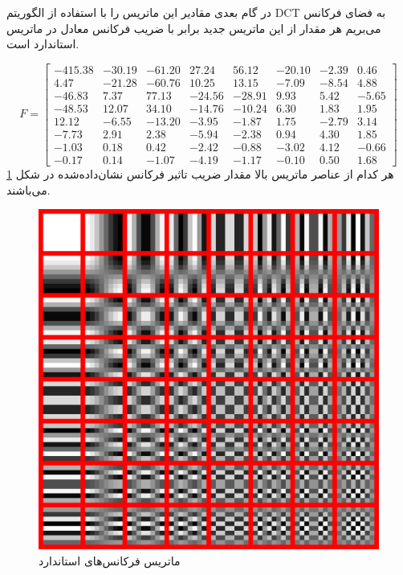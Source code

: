 در گام بعدی مقادیر این ماتریس را با استفاده از الگوریتم 
DCT به فضای فرکانس می‌بریم
هر مقدار از این ماتریس جدید برابر با ضریب فرکانس معادل در ماتریس 
استاندارد است. 

\[
        F = \begin{bmatrix}
                -415.38 & -30.19 & -61.20 & 27.24 & 56.12 & -20.10 & -2.39 & 0.46\\
                4.47 & -21.28 & -60.76 & 10.25 & 13.15 & -7.09 & -8.54 & 4.88 \\
                -46.83 & 7.37 & 77.13 & -24.56 & -28.91 & 9.93 & 5.42 & -5.65 \\
                -48.53 & 12.07 & 34.10 & -14.76 & -10.24 & 6.30 & 1.83 & 1.95 \\
                12.12 & -6.55 & -13.20 & -3.95 & -1.87 & 1.75 & -2.79 & 3.14 \\
                -7.73 & 2.91 & 2.38 & -5.94 & -2.38 & 0.94 & 4.30 & 1.85 \\
                -1.03 & 0.18 & 0.42 & -2.42 & -0.88 & -3.02 & 4.12 & -0.66 \\
                -0.17 & 0.14 & -1.07 & -4.19 & -1.17 & -0.10 & 0.50 & 1.68 

        \end{bmatrix}
\]
هر کدام از عناصر ماتریس بالا مقدار ضریب تاثیر فرکانس نشان‌داده‌شده در شکل 
\ref{freq_3} 
می‌باشند. 

\begin{figure}[]
        \centering
        \includegraphics[]{figs/freq_3.png}
        \caption{ماتریس فرکانس‌های استاندارد}
        \label{freq_3}
\end{figure}

